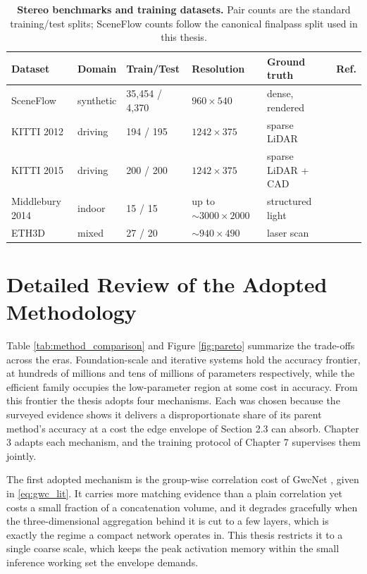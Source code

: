 \begin{table}[!htbp]
\centering
\caption{\textbf{Stereo benchmarks and training datasets.} Pair counts are the standard training/test splits; SceneFlow counts follow the canonical finalpass split used in this thesis.}
\label{tab:datasets}
\small
\begin{tabular}{lllllc}
\toprule
Dataset & Domain & Train/Test & Resolution & Ground truth & Ref.\\
\midrule
SceneFlow & synthetic & 35{,}454 / 4{,}370 & $960{\times}540$ & dense, rendered & \cite{mayer2016sceneflow}\\
KITTI 2012 & driving & 194 / 195 & $1242{\times}375$ & sparse LiDAR & \cite{geiger2012kitti}\\
KITTI 2015 & driving & 200 / 200 & $1242{\times}375$ & sparse LiDAR + CAD & \cite{menze2015kitti}\\
Middlebury 2014 & indoor & 15 / 15 & up to ${\sim}3000{\times}2000$ & structured light & \cite{scharstein2014middlebury}\\
ETH3D & mixed & 27 / 20 & ${\sim}940{\times}490$ & laser scan & \cite{schops2017eth3d}\\
\bottomrule
\end{tabular}
\end{table}

\FloatBarrier
\section{Detailed Review of the Adopted Methodology}
Table \ref{tab:method_comparison} and Figure \ref{fig:pareto} summarize
the trade-offs across the eras. Foundation-scale and iterative systems
hold the accuracy frontier, at hundreds of millions and tens of millions
of parameters respectively, while the efficient family occupies the
low-parameter region at some cost in accuracy. From this frontier the
thesis adopts four mechanisms. Each was chosen because the surveyed
evidence shows it delivers a disproportionate share of its parent
method's accuracy at a cost the edge envelope of Section 2.3 can absorb.
Chapter 3 adapts each mechanism, and the training protocol of Chapter 7
supervises them jointly.

The first adopted mechanism is the group-wise correlation cost of GwcNet
\cite{guo2019gwcnet}, given in \eqref{eq:gwc_lit}. It carries more
matching evidence than a plain correlation yet costs a small fraction of
a concatenation volume, and it degrades gracefully when the
three-dimensional aggregation behind it is cut to a few layers, which is
exactly the regime a compact network operates in. This thesis restricts
it to a single coarse scale, which keeps the peak activation memory
within the small inference working set the envelope demands.

